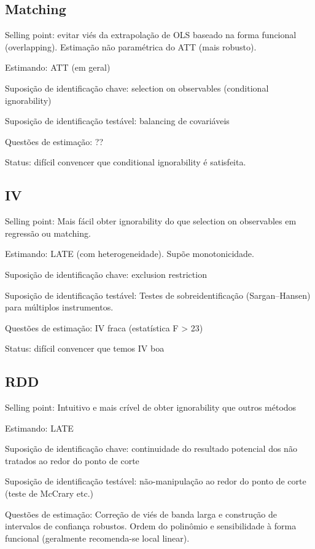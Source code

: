 \documentclass[
]{article}
\begin{document}
\subsection{Matching}\label{matching-1}

Selling point: evitar viés da extrapolação de OLS baseado na forma funcional (overlapping). Estimação não paramétrica do ATT (mais robusto).

Estimando: ATT (em geral)

Suposição de identificação chave: selection on observables (conditional ignorability)

Suposição de identificação testável: balancing de covariáveis

Questões de estimação: ??

Status: difícil convencer que conditional ignorability é satisfeita.

\subsection{IV}\label{iv}

Selling point: Mais fácil obter ignorability do que selection on observables em regressão ou matching.

Estimando: LATE (com heterogeneidade). Supõe monotonicidade.

Suposição de identificação chave: exclusion restriction

Suposição de identificação testável: Testes de sobreidentificação (Sargan--Hansen) para múltiplos instrumentos.

Questões de estimação: IV fraca (estatística F \textgreater{} 23)

Status: difícil convencer que temos IV boa

\subsection{RDD}\label{rdd}

Selling point: Intuitivo e mais crível de obter ignorability que outros métodos

Estimando: LATE

Suposição de identificação chave: continuidade do resultado potencial dos não tratados ao redor do ponto de corte

Suposição de identificação testável: não-manipulação ao redor do ponto de corte (teste de McCrary etc.)

Questões de estimação: Correção de viés de banda larga e construção de intervalos de confiança robustos. Ordem do polinômio e sensibilidade à forma funcional (geralmente recomenda-se local linear).
\end{document}
